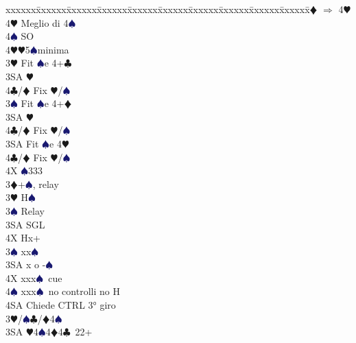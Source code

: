\documentclass[a4paper,italian]{article}
\newcommand{\BC}{\textcolor{OliveGreen}{$\clubsuit$}}
\newcommand{\BD}{\textcolor{RedOrange}{$\vardiamondsuit$}}
\newcommand{\BH}{\textcolor{Red2}{$\varheartsuit${}}}
\newcommand{\BS}{\textcolor{MidnightBlue}{$\spadesuit${}}}
\newenvironment{bidtable}
{\begin{tabbing}

    xxxxxx\=xxxxxx\=xxxxxx\=xxxxxx\=xxxxxx\=xxxxxx\=xxxxxx\=xxxxxx\=xxxxxx\=xxxxxx\=\kill}
{\end{tabbing} }%
\begin{document}
\begin{multicols}{2}
\begin{bidtable}
                                            4\BD \> $\Rightarrow$ 4\BH\\
                                            4\BH \> Meglio di 4\BS\\
                                            4\BS \> SO\-\\
                                            4\BH {}\BH 5\BS minima\-\\
                                            3\BH \> Fit \BS e 4+\BC \+\\
                                            3SA \BH \+\\
                                            4\BC/\BD \> Fix \BH/\BS\-\-\\
                                            3\BS \> Fit \BS e 4+\BD \+\\
                                            3SA \BH \+\\
                                            4\BC/\BD \> Fix \BH/\BS\-\-\\
                                            3SA \> Fit \BS e 4\BH \+\\
                                            4\BC/\BD \> Fix \BH/\BS\-\\
                                            4X \BS 333\-\\
                                            3\BD {}+\BS , relay\+\\
                                            3\BH \> H\BS \+\\
                                            3\BS \> Relay\+\\
                                            3SA \> SGL\\
                                            4X \> Hx+\-\-\\
                                            3\BS \> xx\BS \\
                                            3SA \> x o -\BS \\
                                            4X \> xxx\BS\ cue\\
                                            4\BS \> xxx\BS\ no controlli no H\+\\
                                            4SA \> Chiede CTRL 3° giro\-\-\\
                                            3\BH/\BS {}\BC /\BD 4\BS \\
                                            3SA \BH 4\BS 4\BD 4\BC\ 22+\\

\end{bidtable}
\end{multicols}
\end{document}
